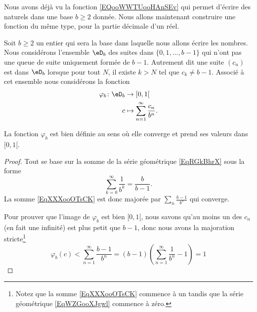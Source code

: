 Nous avons déjà vu la fonction \eqref{EQooWWTUooHAnSEv} qui permet d'écrire des naturels dans une base \( b\geq 2\) donnée. Nous allons maintenant construire une fonction du même type, pour la partie décimale d'un réel.

\begin{normaltext}      \label{NORMALooTZWYooPMgOIm}
	Soit \( b\geq 2\) un entier qui sera la base dans laquelle nous allons écrire les nombres. Nous considérons l'ensemble \( \eD_b\) des suites dans \( \{ 0,1,\ldots, b-1 \}\) qui n'ont pas une queue de suite uniquement formée de \( b-1\). Autrement dit une suite \( (c_n)\) est dans \( \eD_b\) lorsque pour tout \( N\), il existe \( k>N\) tel que \( c_k\neq b-1\). Associé à cet ensemble nous considérons la fonction
	\begin{equation}    \label{EqXXXooOTsCK}
		\begin{aligned}
			\varphi_b\colon \eD_b & \to \mathopen[ 0 , 1 [                          \\
			c                     & \mapsto \sum_{n=1}^{\infty}\frac{ c_n }{ b^n }.
		\end{aligned}
	\end{equation}
\end{normaltext}

\begin{lemma}
	La fonction \( \varphi_b\) est bien définie au sens où elle converge et prend ses valeurs dans \( \mathopen[ 0 , 1 [\).
\end{lemma}

\begin{proof}
	Tout se base sur la somme de la série géométrique \eqref{EqRGkBhrX} sous la forme
	\begin{equation}    \label{EqWZGooXJgwl}
		\sum_{k=0}^{\infty}\frac{1}{ b^k }=\frac{ b }{ b-1 }.
	\end{equation}
	La somme \eqref{EqXXXooOTsCK} est donc majorée par \( \sum_n\frac{ b-1 }{ b^n }\) qui converge.

	Pour prouver que l'image de \( \varphi_b\) est bien \( \mathopen[ 0 , 1 [\), nous savons qu'au moins un des \( c_n\) (en fait une infinité) est plus petit que \( b-1\), donc nous avons la majoration stricte\footnote{Notez que la somme \eqref{EqXXXooOTsCK} commence à un tandis que la série géométrique \eqref{EqWZGooXJgwl} commence à zéro.}
	\begin{equation}
		\varphi_b(c)<\sum_{n=1}^{\infty}\frac{ b-1 }{ b^n }=(b-1)\left( \sum_{n=1}^{\infty}\frac{1}{ b^n }-1 \right)=1
	\end{equation}
\end{proof}

